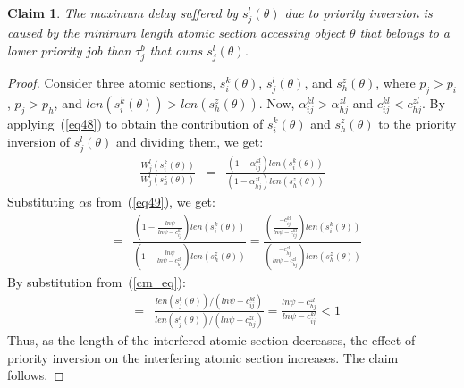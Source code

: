 \documentclass[conference]{IEEEtran}
\newtheorem{clm}{Claim}
\begin{document}
\begin{clm}
\label{max_pri_inv}
The maximum delay suffered by $s_j^l(\theta)$ due to priority inversion is caused by the minimum length atomic section accessing object $\theta$ that belongs to a lower priority job than $\tau_j^b$ that owns $s_j^l(\theta)$.
\end{clm}
\begin{proof}
Consider three atomic sections, $s_i^k(\theta)$, $s_j^l(\theta)$, and $s_h^z(\theta)$, where $p_j>p_i$, $p_j>p_h$, and $len(s_i^k(\theta))>len(s_h^z(\theta))$. Now, $\alpha_{ij}^{kl}>\alpha_{hj}^{zl}$ and $c_{ij}^{kl}<c_{hj}^{zl}$. By applying~(\ref{eq48}) to obtain the contribution of $s_i^k(\theta)$ and $s_h^z(\theta)$ to the priority inversion of $s_j^l(\theta)$ and dividing them, we get:
\begin{eqnarray*}
\frac{W_{j}^{l}(s_{i}^{k}(\theta))}{W_{j}^{l}(s_{h}^{z}(\theta))} & = & \frac{\left(1-\alpha_{ij}^{kl}\right)len(s_{i}^{k}(\theta))}{\left(1-\alpha_{hj}^{zl}\right)len(s_{h}^{z}(\theta))}
\end{eqnarray*}
Substituting $\alpha$s from~(\ref{eq49}), we get:
\begin{eqnarray*}
 & = & \frac{(1-\frac{ln\psi}{ln\psi-c_{ij}^{kl}})len(s_{i}^{k}(\theta))}{(1-\frac{ln\psi}{ln\psi-c_{hj}^{zl}})len(s_{h}^{z}(\theta))}
  =  \frac{(\frac{-c_{ij}^{kl}}{ln\psi-c_{ij}^{kl}})len(s_{i}^{k}(\theta))}{(\frac{-c_{hj}^{zl}}{ln\psi-c_{hj}^{zl}})len(s_{h}^{z}(\theta))}\end{eqnarray*}
By substitution from~(\ref{cm_eq}):
\begin{eqnarray*}
 & = & \frac{len(s_{j}^{l}(\theta))/(ln\psi-c_{ij}^{kl})}{len(s_{j}^{l}(\theta))/(ln\psi-c_{hj}^{zl})}
  =  \frac{ln\psi-c_{hj}^{zl}}{ln\psi-c_{ij}^{kl}}<1\end{eqnarray*}
Thus, as the length of the interfered atomic section decreases, the effect of priority inversion on the interfering atomic section increases. 
The claim follows.
\end{proof}



\end{document}
